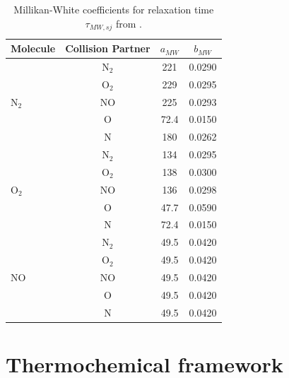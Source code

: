 \begin{table}[ht]
    \centering
    \caption{Millikan-White coefficients for relaxation time $\tau_{MW,sj}$ from \cite{Park1993}.}
    \label{tab:millikan_white_coeffs}
    \renewcommand{\arraystretch}{1.2}
    \begin{tabular}{l c c c}
        \toprule
        Molecule & Collision Partner & $a_{MW}$ & $b_{MW}$ \\
        \midrule
        \multirow{5}{*}{$\text{N}_2$} & $\text{N}_2$ & 221 & 0.0290 \\
                                       & $\text{O}_2$ & 229 & 0.0295 \\
                                       & NO & 225 & 0.0293 \\
                                       & O & 72.4 & 0.0150 \\
                                       & N & 180 & 0.0262 \\
        \midrule
        \multirow{5}{*}{$\text{O}_2$} & $\text{N}_2$ & 134 & 0.0295 \\
                                       & $\text{O}_2$ & 138 & 0.0300 \\
                                       & NO & 136 & 0.0298 \\
                                       & O & 47.7 & 0.0590 \\
                                       & N & 72.4 & 0.0150 \\
        \midrule
        \multirow{5}{*}{NO} & $\text{N}_2$ & 49.5 & 0.0420 \\
                            & $\text{O}_2$ & 49.5 & 0.0420 \\
                            & NO & 49.5 & 0.0420 \\
                            & O & 49.5 & 0.0420 \\
                            & N & 49.5 & 0.0420 \\
        \bottomrule
    \end{tabular}
\end{table}


\section{Thermochemical framework}


